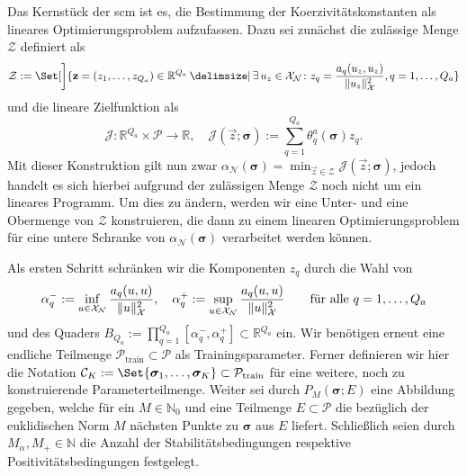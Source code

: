 \documentclass[../main.tex]{subfiles}
\begin{document}
Das Kernstück der \ac{scm} ist es, die Bestimmung der Koerzivitätskonstanten als lineares Optimierungsproblem aufzufassen.
Dazu sei zunächst die zulässige Menge $\mathcal Z$ definiert als
\begin{equation}
    \mathcal Z := \Set[\bigg]{ \vec{z} = (z_{1}, \dots, z_{Q_a}) \in \mathbb{R}^{Q_a} \given \exists \, u_{z} \in \mathcal X_{\mathcal N} \colon z_{q} = \frac{a_{q}(u_{z}, u_{z})}{\norm{u_{z}}_{\mathcal X}^{2}}, q = 1, \dots, Q_a}
\end{equation}
und die lineare Zielfunktion als
\begin{equation}
    \mathcal J \colon \mathbb{R}^{Q_a} \times \mathcal P \to \mathbb{R}, \quad \mathcal J(\vec{z} ;\bm \sigma) := \sum_{q = 1}^{Q_a} \theta_{q}^{a}(\bm \sigma) z_{q}.
\end{equation}
Mit dieser Konstruktion gilt nun zwar $\alpha_{\mathcal N}(\bm \sigma) = \min_{\vec{z} \in \mathcal Z} \mathcal J(\vec{z}; \bm \sigma)$, jedoch handelt es sich hierbei aufgrund der zulässigen Menge $\mathcal Z$ noch nicht um ein lineares Programm.
Um dies zu ändern, werden wir eine Unter- und eine Obermenge von $\mathcal Z$ konstruieren, die dann zu einem linearen Optimierungsproblem für eine untere Schranke von $\alpha_{\mathcal N}(\bm \sigma)$ verarbeitet werden können.

Als ersten Schritt schränken wir die Komponenten $z_{q}$ durch die Wahl von
\begin{equation}
    \alpha_{q}^{-} := \inf_{u \in \mathcal X_{\mathcal{N}}} \frac{a_{q}(u, u)}{\norm{u}^{2}_{\mathcal X}},
    \quad
    \alpha_{q}^{+} := \sup_{u \in \mathcal X_{\mathcal{N}}} \frac{a_{q}(u, u)}{\norm{u}^{2}_{\mathcal X}}
    \qquad \fa q = 1, \dots, Q_a
\end{equation}
und des Quaders $B_{Q_a} := \prod_{q = 1}^{Q_a} [\alpha^{-}_{q}, \alpha^{+}_{q}] \subset \mathbb{R}^{Q_a}$ ein.
Wir benötigen erneut eine endliche Teilmenge $\mathcal P_{\mathrm{train}} \subset \mathcal P$ als Trainingsparameter.
Ferner definieren wir hier die Notation $\mathcal C_{K} := \Set{ \bm \sigma_{1}, \dots, \bm \sigma_{K} } \subset \mathcal P_{\mathrm{train}}$ für eine weitere, noch zu konstruierende Parameterteilmenge.
Weiter sei durch $P_{M}(\bm \sigma; E)$ eine Abbildung gegeben, welche für ein $M \in \mathbb{N}_{0}$ und eine Teilmenge $E \subset \mathcal P$ die bezüglich der euklidischen Norm $M$ nächsten Punkte zu $\bm \sigma$ aus $E$ liefert.
Schließlich seien durch $M_{\alpha}, M_{+} \in \mathbb{N}$ die Anzahl der Stabilitätsbedingungen respektive Positivitätsbedingungen festgelegt.
\end{document}
